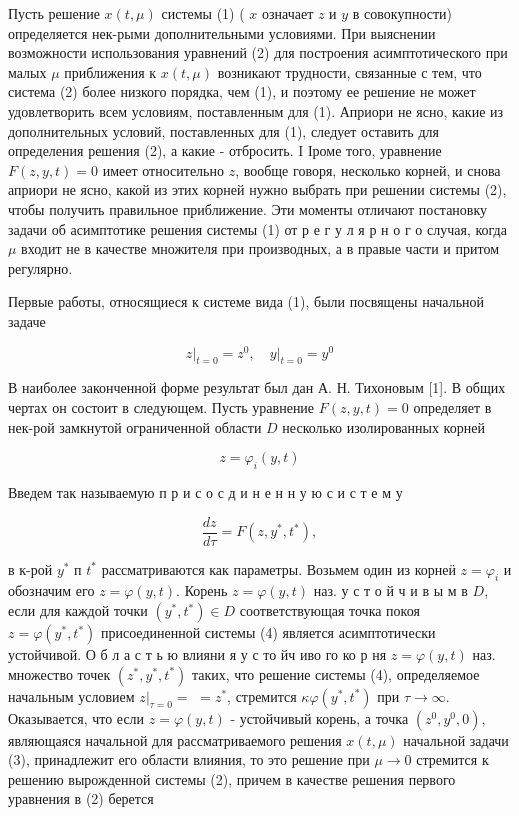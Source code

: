 \documentclass[10pt]{article}
\begin{document}
Пусть решение $x(t, \mu)$ системы (1) ( $x$ означает $z$ и $y$ в совокупности) определяется нек-рыми дополнительными условиями. При выяснении возможности использования уравнений (2) для построения асимптотического при малых $\mu$ приближения к $x(t, \mu)$ возникают трудности, связанные с тем, что система (2) более низкого порядка, чем (1), и поэтому ее решение не может удовлетворить всем условиям, поставленным для (1). Априори не ясно, какие из дополнительных условий, поставленных для (1), следует оставить для определения решения (2), а какие - отбросить. I Іроме того, уравнение $F(z, y, t)=0$ имеет относительно $z$, вообще говоря, несколько корней, и снова априори не ясно, какой из этих корней нужно выбрать при решении системы (2), чтобы получить правильное приближение. Эти моменты отличают постановку задачи об асимптотике решения системы (1) от р е г у л я р н о г о случая, когда $\mu$ входит не в качестве множителя при производных, а в правые части и притом регулярно.



Первые работы, относящиеся к системе вида (1), были посвящены начальной задаче



\[

\left.z\right|_{t=0}=z^{0},\left.\quad y\right|_{t=0}=y^{0}

\]



В наиболее законченной форме результат был дан А. Н. Тихоновым [1]. В общих чертах он состоит в следующем. Пусть уравнение $F(z, y, t)=0$ определяет в нек-рой замкнутой ограниченной области $D$ несколько изолированных корней



\[

z=\varphi_{i}(y, t)

\]



Введем так называемую п р и с о с д и н е н н у ю с и с т е м у



\[

\frac{d z}{d \tau}=F\left(z, y^{*}, t^{*}\right),

\]



в к-рой $y^{*}$ п $t^{*}$ рассматриваются как параметры. Возьмем один из корнеӥ $z=\varphi_{i}$ и обозначим его $z=\varphi(y, t)$. Корень $z=\varphi(y, t)$ наз. у с т о й ч и в ы м в $D$, если для каждой точки $\left(y^{*}, t^{*}\right) \in D$ соответствующая точка покоя $z=\varphi\left(y^{*}, t^{*}\right)$ присоединенной системы (4) является асимптотически устойчивой. О б л а с т ь ю влияни я у с то йч иво го ко р ня $z=\varphi(y, t)$ наз. множество точек $\left(z^{*}, y^{*}, t^{*}\right)$ таких, что решение системы (4), определяемое начальным условием $\left.z\right|_{\tau=0}=$ $=z^{*}$, стремится $\kappa \varphi\left(y^{*}, t^{*}\right)$ при $\tau \rightarrow \infty$. Оказывается, что если $z=\varphi(y, t)$ - устойчивый корень, а точка $\left(z^{0}, y^{0}, 0\right)$, являющаяся начальной для рассматриваемого решения $x(t, \mu)$ начальной задачи (3), принадлежит его области влияния, то это решение при $\mu \rightarrow 0$ стремится к решению вырожденной системы (2), причем в качестве решения первого уравнения в (2) берется
\end{document}
